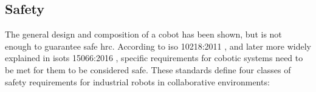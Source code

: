 


\subsection{Safety}


\par The general design and composition of a cobot has been shown, but is not enough to guarantee safe \ac{hrc}. According to \acs{iso} 10218:2011 \cite{iso.10218.1, iso.10218.2}, and later more widely explained in \acs{isots} 15066:2016 \cite{iso.15066}, specific requirements for cobotic systems need to be met for them to be considered safe. These standards define four classes of safety requirements for industrial robots in collaborative environments:

